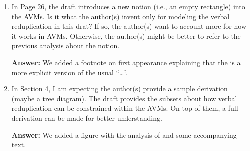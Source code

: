 \documentclass[fleqn,twoside]{article}
\begin{document}
\begin{enumerate}
\item
In Page 26, the draft introduces a new notion (i.e., an empty rectangle) into the AVMs. Is it what
the author(s) invent only for modeling the verbal reduplication in this drat? If so, the author(s)
want to account more for how it works in AVMs. Otherwise, the author(s) might be better to refer to
the previous analysis about the notion.

\noindent
\textbf{Answer: } We added a footnote on first appearance explaining that the \etag is a more
explicit version of the usual ``\ldots''.


\item
In Section 4, I am expecting the author(s) provide a sample derivation (maybe a tree diagram). The draft provides the subsets about how verbal reduplication can be constrained within the AVMs. On top of them, a full derivation can be made for better understanding.

\noindent
\textbf{Answer: } We added a figure with the analysis of  and some
accompanying text.

\end{enumerate}

{\sloppy
\printbibliography[heading=subbibliography,notkeyword=this]
}
\end{document}
